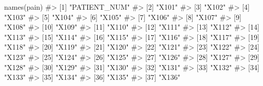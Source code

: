 \documentclass[
  letterpaper,
]{latex/krantz}
\makeatletter
\newenvironment{Shaded}{\begin{snugshade}}{\end{snugshade}}
\newcommand{\CommentTok}[1]{\textcolor[rgb]{0.37,0.37,0.37}{#1}}
\newcommand{\FunctionTok}[1]{\textcolor[rgb]{0.28,0.35,0.67}{#1}}
\newcommand{\NormalTok}[1]{\textcolor[rgb]{0.00,0.23,0.31}{#1}}
\newenvironment{kframe}{%
\medskip{}
\setlength{\fboxsep}{.8em}
 \def\at@end@of@kframe{}%
 \ifinner\ifhmode%
  \def\at@end@of@kframe{\end{minipage}}%
  \begin{minipage}{\columnwidth}%
 \fi\fi%
 \def\FrameCommand##1{\hskip\@totalleftmargin \hskip-\fboxsep
 \colorbox{shadecolor}{##1}\hskip-\fboxsep
     \hskip-\linewidth \hskip-\@totalleftmargin \hskip\columnwidth}%
 \MakeFramed {\advance\hsize-\width
   \@totalleftmargin\z@ \linewidth\hsize
   \@setminipage}}%
 {\par\unskip\endMakeFramed%
 \at@end@of@kframe}
\renewenvironment{Shaded}{\begin{kframe}}{\end{kframe}}
\makeatother
\begin{document}
\begin{Shaded}
\begin{Highlighting}[]
\FunctionTok{names}\NormalTok{(pain)}
\CommentTok{\#\textgreater{}  [1] "PATIENT\_NUM"                     }
\CommentTok{\#\textgreater{}  [2] "X101"                            }
\CommentTok{\#\textgreater{}  [3] "X102"                            }
\CommentTok{\#\textgreater{}  [4] "X103"                            }
\CommentTok{\#\textgreater{}  [5] "X104"                            }
\CommentTok{\#\textgreater{}  [6] "X105"                            }
\CommentTok{\#\textgreater{}  [7] "X106"                            }
\CommentTok{\#\textgreater{}  [8] "X107"                            }
\CommentTok{\#\textgreater{}  [9] "X108"                            }
\CommentTok{\#\textgreater{} [10] "X109"                            }
\CommentTok{\#\textgreater{} [11] "X110"                            }
\CommentTok{\#\textgreater{} [12] "X111"                            }
\CommentTok{\#\textgreater{} [13] "X112"                            }
\CommentTok{\#\textgreater{} [14] "X113"                            }
\CommentTok{\#\textgreater{} [15] "X114"                            }
\CommentTok{\#\textgreater{} [16] "X115"                            }
\CommentTok{\#\textgreater{} [17] "X116"                            }
\CommentTok{\#\textgreater{} [18] "X117"                            }
\CommentTok{\#\textgreater{} [19] "X118"                            }
\CommentTok{\#\textgreater{} [20] "X119"                            }
\CommentTok{\#\textgreater{} [21] "X120"                            }
\CommentTok{\#\textgreater{} [22] "X121"                            }
\CommentTok{\#\textgreater{} [23] "X122"                            }
\CommentTok{\#\textgreater{} [24] "X123"                            }
\CommentTok{\#\textgreater{} [25] "X124"                            }
\CommentTok{\#\textgreater{} [26] "X125"                            }
\CommentTok{\#\textgreater{} [27] "X126"                            }
\CommentTok{\#\textgreater{} [28] "X127"                            }
\CommentTok{\#\textgreater{} [29] "X128"                            }
\CommentTok{\#\textgreater{} [30] "X129"                            }
\CommentTok{\#\textgreater{} [31] "X130"                            }
\CommentTok{\#\textgreater{} [32] "X131"                            }
\CommentTok{\#\textgreater{} [33] "X132"                            }
\CommentTok{\#\textgreater{} [34] "X133"                            }
\CommentTok{\#\textgreater{} [35] "X134"                            }
\CommentTok{\#\textgreater{} [36] "X135"                            }
\CommentTok{\#\textgreater{} [37] "X136"                            }

\end{Highlighting}
\end{Shaded}
\end{document}
